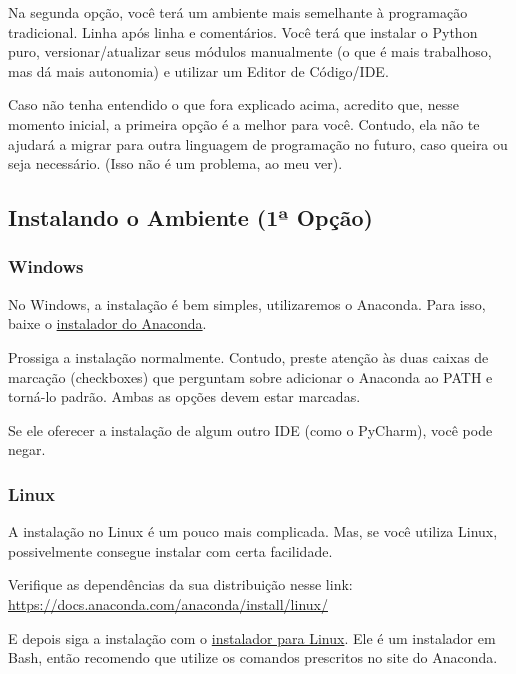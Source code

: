 \documentclass[11pt, brazilian]{article}
\begin{document}
Na segunda opção, você terá um ambiente mais semelhante à programação
tradicional. Linha após linha e comentários. Você terá que instalar o
Python puro, versionar/atualizar seus módulos manualmente (o que é mais
trabalhoso, mas dá mais autonomia) e utilizar um Editor de Código/IDE.

Caso não tenha entendido o que fora explicado acima, acredito que, nesse
momento inicial, a primeira opção é a melhor para você. Contudo, ela não
te ajudará a migrar para outra linguagem de programação no futuro, caso
queira ou seja necessário. (Isso não é um problema, ao meu ver).

\hypertarget{instalando-o-ambiente-1uxaa-opuxe7uxe3o}{%
\subsection{Instalando o Ambiente (1ª
Opção)}\label{instalando-o-ambiente-1uxaa-opuxe7uxe3o}}

\hypertarget{windows}{%
\subsubsection{Windows}\label{windows}}

No Windows, a instalação é bem simples, utilizaremos o Anaconda. Para
isso, baixe o
\href{https://www.anaconda.com/download/\#windows}{instalador do
Anaconda}.

Prossiga a instalação normalmente. Contudo, preste atenção às duas
caixas de marcação (checkboxes) que perguntam sobre adicionar o Anaconda
ao PATH e torná-lo padrão. Ambas as opções devem estar marcadas.

Se ele oferecer a instalação de algum outro IDE (como o PyCharm), você
pode negar.

\hypertarget{linux}{%
\subsubsection{Linux}\label{linux}}

A instalação no Linux é um pouco mais complicada. Mas, se você utiliza
Linux, possivelmente consegue instalar com certa facilidade.

Verifique as dependências da sua distribuição nesse link:
\url{https://docs.anaconda.com/anaconda/install/linux/}

E depois siga a instalação com o
\href{https://www.anaconda.com/download/\#linux}{instalador para Linux}.
Ele é um instalador em Bash, então recomendo que utilize os comandos
prescritos no site do Anaconda.
\end{document}
